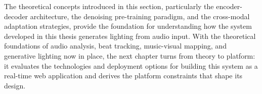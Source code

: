 The theoretical concepts introduced in this section, particularly the encoder-decoder architecture, the denoising pre-training paradigm, and the cross-modal adaptation strategies, provide the foundation for understanding how the system developed in this thesis generates lighting from audio input. With the theoretical foundations of audio analysis, beat tracking, music-visual mapping, and generative lighting now in place, the next chapter turns from theory to platform: it evaluates the technologies and deployment options for building this system as a real-time web application and derives the platform constraints that shape its design.
